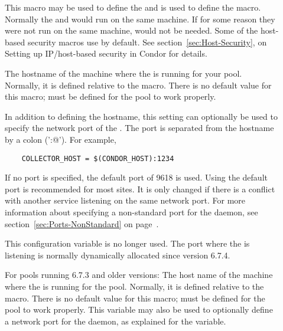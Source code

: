 \begin{description}
  
\item[] \label{param:CondorHost} This macro may be
  used to define the  and is used to define the
   macro.  Normally the 
  and  would run on the same machine.  If for some
  reason they were not run on the same machine,
   would not be needed.  Some
  of the host-based security macros use  by
  default.  See section~\ref{sec:Host-Security}, on Setting up
  IP/host-based security in Condor for details.
  
\item[] \label{param:CollectorHost} The
  hostname of the machine where the  is running for
  your pool.  Normally, it is defined relative to
  the 
  macro.  There is no default value for this macro;
   must be defined for the pool to work
  properly.

  In addition to defining the hostname, this setting can optionally be
  used to specify the network port of the .
  The port is separated from the hostname by a colon ('\verb@:@').
  For example,
  \begin{verbatim}
    COLLECTOR_HOST = $(CONDOR_HOST):1234
  \end{verbatim}
  If no port is specified, the default port of 9618 is used.
  Using the default port is recommended for most sites.
  It is only changed if there is a conflict with another
  service listening on the same network port.
  For more information about specifying a non-standard port for the
   daemon,
  see section~\ref{sec:Ports-NonStandard} on
  page~\pageref{sec:Ports-NonStandard}.


\item[] \label{param:NegotiatorHost} 
  This configuration variable is no longer used.
  The port where the  is listening is normally
  dynamically allocated since version 6.7.4.

  For pools running 6.7.3 and older versions: The
  host name of the machine where the  is running for
  the pool.
  Normally, it is defined relative to the 
  macro.  There is no default value for this macro;
   must be defined for the pool to work
  properly.
  This variable may also be used to optionally define a network port for
  the  daemon, as explained for the
   variable.


\end{description}
